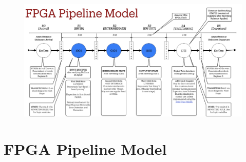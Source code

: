 \documentclass[../HFT-main.tex]{subfiles}
\begin{document}
\clearpage
\begin{fullwidth}
\begin{figure}[ht]
  \centering
  \includegraphics[width=1.5\linewidth]{../figures/FPGA-Pipeline-Model.png}

\end{figure}
\end{fullwidth}
  
\section{FPGA Pipeline Model}
\end{document}
